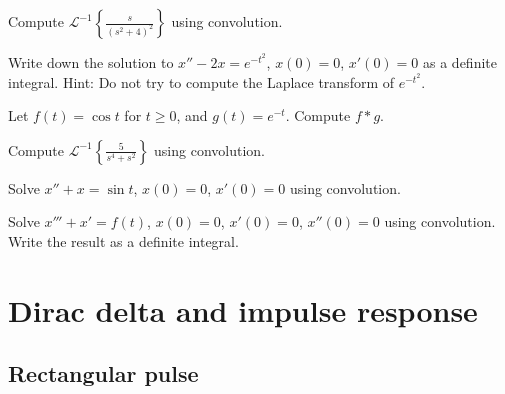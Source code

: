 \begin{exercise}
Compute ${\mathcal{L}}^{-1} \left\{ \frac{s}{{(s^2+4)}^2} \right\}$ using
convolution.
\end{exercise}

\begin{exercise}
Write down the solution to
$x''-2x=e^{-t^2}$, $x(0)=0$, $x'(0)=0$ as a
definite integral.  Hint: Do not try to compute the
Laplace transform of $e^{-t^2}$.
\end{exercise}

\setcounter{exercise}{100}

\begin{exercise}
Let $f(t) = \cos t$ for $t \geq 0$, and $g(t) = e^{-t}$.  Compute
$f * g$.
\end{exercise}

\begin{exercise}
Compute ${\mathcal{L}}^{-1} \left\{ \frac{5}{s^4+s^2} \right\}$ using
convolution.
\end{exercise}

\begin{exercise}
Solve $x''+x = \sin t$, $x(0) = 0$, $x'(0)=0$ using convolution.
\end{exercise}

\begin{exercise}
Solve $x'''+x' = f(t)$, $x(0) = 0$, $x'(0)=0$, $x''(0)=0$ using convolution.
Write the result as a definite integral.
\end{exercise}


\sectionnewpage
\section{Dirac delta and impulse response}
\label{diracdelta:section}



\subsection{Rectangular pulse}

